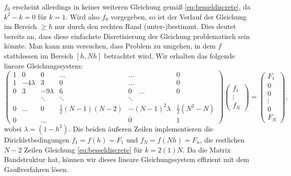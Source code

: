 $f_0$ erscheint allerdings in keiner weiteren Gleichung gemäß
\eqref{eq:besseldiscrete}, da $k^2-k=0$ für $k=1$. Wird also $f_0$
vorgegeben, so ist der Verlauf der Gleichung im Bereich $\ge h$ nur
durch den rechten Rand (unter-)bestimmt. Dies deutet bereits an, dass
diese einfachste Disretisierung der Gleichung problematisch sein
könnte. Man kann nun versuchen, dass Problem zu umgehen, in dem $f$
stattdessen im Bereich $[h, Nh]$ betrachtet wird. Wir erhalten das
folgende lineare Gleichungssystem:
\begin{equation}
  \begin{pmatrix}
    1 & 0         & 0         &\ldots & \ldots & 0\\
    1 & -4\lambda & 3         & 0 & \ldots & 0\\
    0 & 3         & -9\lambda & 6 & 0\quad \ldots & 0\\
    & & \ddots & \ddots & \ddots\qquad\qquad \\
    0 & \ldots & 0 & \frac{1}{2}(N-1)(N-2) & -(N-1)^2\lambda & \frac{1}{2}(N^2-N)\\
    0 &          &  \ldots  &   & 0      & 1
  \end{pmatrix}
  \begin{pmatrix}
    f_1\\
    \vdots\\
    f_N
  \end{pmatrix}=
  \begin{pmatrix}
    F_1\\
    0\\
    0\\
    \vdots\\
    0 \\
    F_N
  \end{pmatrix},
\end{equation}
wobei $\lambda=(1-h^2)$. Die beiden äußeren Zeilen implementieren die
Dirichletbedingungen $f_1 = f(h)=F_1$ und $f_N = f(Nh) = F_n$, die
restlichen $N-2$ Zeilen Gleichung \eqref{eq:besseldiscrete} für
$k=2(1)N$.  Da die Matrix Bandstruktur hat, können wir dieses lineare
Gleichungssystem effizient mit dem Gaußverfahren lösen.

